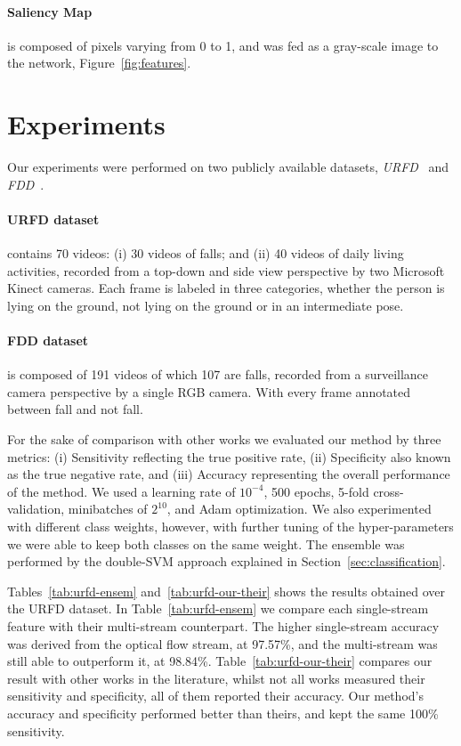 \documentclass[conference]{IEEEtran}
\begin{document}
\paragraph{Saliency Map} is composed of pixels varying from 0 to 1, and was fed as a gray-scale image to the network, Figure~\ref{fig:features}.

\section{Experiments}
\label{sec:experiments}

Our experiments were performed on two publicly available datasets, \textit{URFD}~\cite{kepski2014human} and \textit{FDD}~\cite{charfi2013optimised}.

\paragraph{URFD dataset} contains 70 videos: (i) 30 videos of falls; and (ii) 40 videos of daily living activities, recorded from a top-down and side view perspective by two Microsoft Kinect cameras. Each frame is labeled in three categories, whether the person is lying on the ground, not lying on the ground or in an intermediate pose.
\paragraph{FDD dataset} is composed of 191 videos of which 107 are falls, recorded from a surveillance camera perspective by a single RGB camera. With every frame annotated between fall and not fall.

For the sake of comparison with other works we evaluated our method by three metrics: (i) Sensitivity reflecting the true positive rate, (ii) Specificity also known as the true negative rate, and (iii) Accuracy representing the overall performance of the method. We used a learning rate of $10^{-4}$, 500 epochs, 5-fold cross-validation, minibatches of $2^{10}$, and Adam optimization. We also experimented with different class weights, however, with further tuning of the hyper-parameters we were able to keep both classes on the same weight. The ensemble was performed by the double-SVM approach explained in Section~\ref{sec:classification}.

Tables~\ref{tab:urfd-ensem} and~\ref{tab:urfd-our-their} shows the results obtained over the URFD dataset. In Table~\ref{tab:urfd-ensem} we compare each single-stream feature with their multi-stream counterpart. The higher single-stream accuracy was derived from the optical flow stream, at 97.57\%, and the multi-stream was still able to outperform it, at 98.84\%. Table~\ref{tab:urfd-our-their} compares our result with other works in the literature, whilst not all works measured their sensitivity and specificity, all of them reported their accuracy. Our method's accuracy and specificity performed better than theirs, and kept the same 100\% sensitivity.
\end{document}
